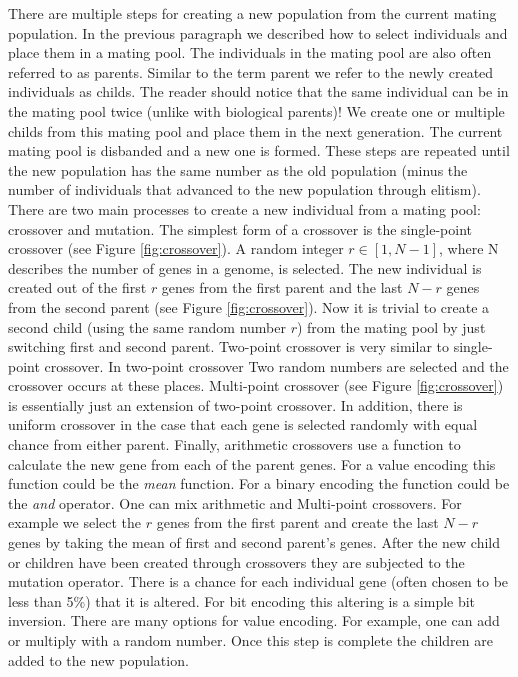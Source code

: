 There are multiple steps for creating a new population from the current mating population. In the previous paragraph we described how to select \glspl{individual} and place them in a mating pool. The \glspl{individual} in the mating pool are also often referred to as \glspl{parent}. Similar to the term \gls{parent} we refer to the newly created \glspl{individual} as \glspl{child}. The reader should notice that the same individual can be in the mating pool twice (unlike with biological \glspl{parent})! We create one or multiple \glspl{child} from this mating pool and place them in the next generation. The current mating pool is disbanded and a new one is formed. These steps are repeated until the new population has the same number as the old population (minus the number of individuals that advanced to the new population through \gls{elitism}). There are two main processes to create a new individual from a mating pool: \gls{crossover} and \gls{mutation}. The simplest form of a \gls{crossover} is the single-point \gls{crossover} (see Figure \ref{fig:crossover}). A random integer $r \in [1,N-1]$, where N describes the number of \glspl{gene} in a \gls{genome}, is selected. The new individual is created out of the first $r$ genes from the first parent and the last $N-r$ genes from the second parent (see Figure \ref{fig:crossover}). Now it is trivial to create a second child (using the same random number $r$) from the mating pool by just switching first and second \gls{parent}. 
Two-point \gls{crossover} is very similar to single-point crossover. In two-point \gls{crossover} Two random numbers are selected and the crossover occurs at these places. Multi-point \gls{crossover} (see Figure \ref{fig:crossover}) is essentially just an extension of two-point \gls{crossover}. In addition, there is uniform \gls{crossover} in the case that each gene is selected randomly with equal chance from either parent. Finally, arithmetic \glspl{crossover} use a function to calculate the new gene from each of the parent genes. For a value encoding this function could be the \emph{mean} function. For a binary encoding the function could be the \textit{and} operator. 
One can mix arithmetic and Multi-point  crossovers. For example we select the $r$ genes from the first parent and create the last $N-r$ genes by taking the mean of first and second parent's \glspl{gene}. After the new child or children have been created through \glspl{crossover} they are subjected to the mutation operator. There is a chance for each individual gene (often chosen to be less than 5\%) that it is altered. For bit encoding this altering is a simple bit inversion. There are many options for value encoding. For example, one can add or multiply with a random number. Once this step is complete the children are added to the new population.

